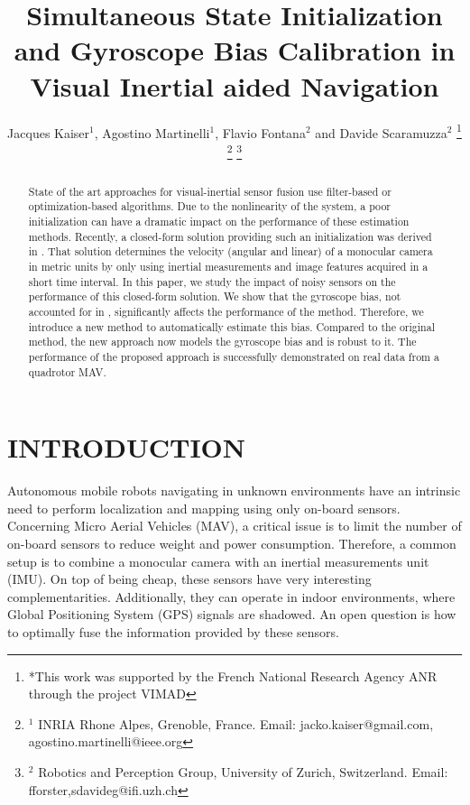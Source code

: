 \documentclass[letterpaper, 10 pt, journal, final]{ieeeconf}  %
\title{\LARGE \bf
Simultaneous State Initialization and Gyroscope Bias Calibration in Visual Inertial aided Navigation
}
\author{Jacques Kaiser$^{1}$, Agostino Martinelli$^{1}$, Flavio Fontana$^{2}$ and Davide Scaramuzza$^{2}$%
 \thanks{*This work was supported by the French National Research
Agency ANR through the project VIMAD}%
 \thanks{$^{1}$ INRIA Rhone Alpes, Grenoble, France. Email: jacko.kaiser@gmail.com, agostino.martinelli@ieee.org}%
 \thanks{$^{2}$ Robotics and Perception Group, University of Zurich, Switzerland. Email: fforster,sdavideg@ifi.uzh.ch}%
}
\begin{document}
\maketitle
\thispagestyle{empty}
\pagestyle{empty}



\begin{abstract}
State of the art approaches for visual-inertial sensor fusion use filter-based or optimization-based algorithms. Due to the nonlinearity of the system, a poor initialization can have a dramatic impact on the performance of these estimation methods.
Recently, a closed-form solution providing such an initialization was derived in \cite{Martinelli2014}.
That solution determines the velocity (angular and linear) of a monocular camera in metric units by only using inertial measurements and image features acquired in a short time interval.
In this paper, we study the impact of noisy sensors on the performance of this closed-form solution. We show that the gyroscope bias, not accounted for in \cite{Martinelli2014}, significantly affects the performance of the method.
Therefore, we introduce a new method to automatically estimate this bias.
Compared to the original method, the new approach now models the gyroscope bias and is robust to it.
The performance of the proposed approach is successfully demonstrated on real data from a quadrotor MAV.
\end{abstract}



\section{INTRODUCTION}




Autonomous mobile robots navigating in unknown environments have an intrinsic need to perform localization and mapping using only on-board sensors.
Concerning Micro Aerial Vehicles (MAV), a critical issue is to limit the number of on-board sensors to reduce weight and power consumption.
Therefore, a common setup is to combine a monocular camera with an inertial measurements unit (IMU).
On top of being cheap, these sensors have very interesting complementarities.
Additionally, they can operate in indoor environments, where Global Positioning System (GPS) signals are shadowed.
An open question is how to optimally fuse the information provided by these sensors.
\end{document}
